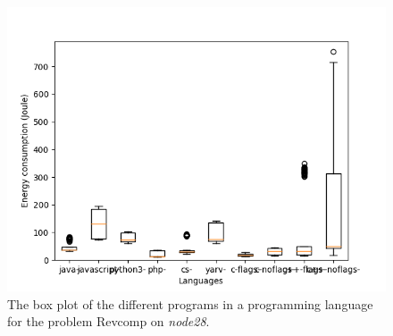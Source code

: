 \begin{appendices}
\begin{figure}[h]
    \centering
    \includegraphics[width=.6\textwidth]{graphs/revcomp_BOXoverview3.png}
    \caption{The box plot of the different programs in a programming language for the problem Revcomp on \textit{node28}.}
    \label{fig:box-revcomp3}
\end{figure}

\begin{table}[h]
\centering
{}
\caption{The comparison of the different languages for the Revcomp problem on \textit{node28}. A \textit{+} means that the language on the row has a lower energy consumption then the language on the column, the opposite for \textit{-}, and the \textit{Unknown} means that we could not reject the null hypothesis.}
\label{tab:lang-revcomp3}
\end{table}


\end{appendices}
